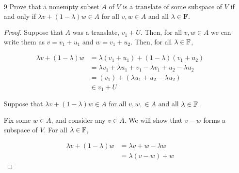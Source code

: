 \begin{enumerate}
    \begin{proof}
        If $c \notin \range T$, then trivially $\{x \in V: Tx = c\}$ is empty. 

        If $c \in \range T$, then there is some $v \in V$ such that $Tv = c$. We will show that $\{x \in V: Tx = c\} = v + \null T$. Consider another $w \in V$ such that $Tw = c$. Then, $T(v - w) = Tv - Tw = 0$, so $v - w \in \null T$. Since $w = v - (v - w) \in v + \null T$, we are done.
    \end{proof}

    (b) Explain why the set of solutions to a system of linear equations such as
    3.27 is either the empty set or is a translate of some subspace of
    $\mathbf{F}^n$.

    \begin{proof}
        Since it is equivalent to the above, obviously.
    \end{proof}

    \item[9] Prove that a nonempty subset $A$ of $V$ is a translate of some subspace of $V$ if
    and only if $\lambda v + (1 - \lambda)w \in A$ for all $v, w \in A$ and all $\lambda \in \mathbf{F}$.

    \begin{proof}
        Suppose that $A$ was a translate, $v_1 + U$. Then, for all $v, w \in A$ we can write them as $v = v_1 + u_1$ and $w = v_1 + u_2$. Then, for all $\lambda \in \mathbb{F}$,

        \begin{align*}
            \lambda v + (1 - \lambda) w &= \lambda(v_1 + u_1) + (1 - \lambda)(v_1 + u_2) \\
            &= \lambda v_1 + \lambda u_1 + v_1 - \lambda v_1 + u_2 - \lambda u_2 \\
            &= (v_1) + (\lambda u_1 + u_2 - \lambda u_2) \\
            &\in v_1 + U
        \end{align*}


        Suppose that $\lambda v + (1 - \lambda)w \in A$ for all $v, w, \in A$ and all $\lambda \in \mathbb{F}$.

        Fix some $w \in A$, and consider any $v \in A$. We will show that $v - w$ forms a subspace of $V$. For all $\lambda \in \mathbb{F}$, 

        \begin{align*}
            \lambda v + (1 - \lambda) w &= \lambda v + w - \lambda w \\
            &= \lambda(v - w) + w 
        \end{align*}


\end{proof}
\end{enumerate}
